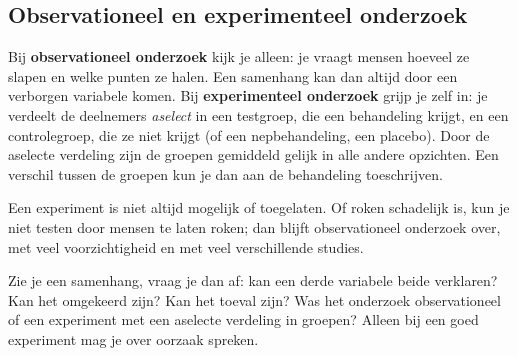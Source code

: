 \begin{oefeningen}
\end{oefeningen}

\subsection{Observationeel en experimenteel onderzoek}

Bij \textbf{observationeel onderzoek} kijk je alleen: je vraagt mensen hoeveel ze slapen en welke punten ze halen. Een samenhang kan dan altijd door een verborgen variabele komen. Bij \textbf{experimenteel onderzoek} grijp je zelf in: je verdeelt de deelnemers \textit{aselect} in een testgroep, die een behandeling krijgt, en een controlegroep, die ze niet krijgt (of een nepbehandeling, een placebo). Door de aselecte verdeling zijn de groepen gemiddeld gelijk in alle andere opzichten. Een verschil tussen de groepen kun je dan aan de behandeling toeschrijven.


Een experiment is niet altijd mogelijk of toegelaten. Of roken schadelijk is, kun je niet testen door mensen te laten roken; dan blijft observationeel onderzoek over, met veel voorzichtigheid en met veel verschillende studies.

\begin{werkwijze}
Zie je een samenhang, vraag je dan af: kan een derde variabele beide verklaren? Kan het omgekeerd zijn? Kan het toeval zijn? Was het onderzoek observationeel of een experiment met een aselecte verdeling in groepen? Alleen bij een goed experiment mag je over oorzaak spreken.
\end{werkwijze}

\begin{oefeningen}

\end{oefeningen}

